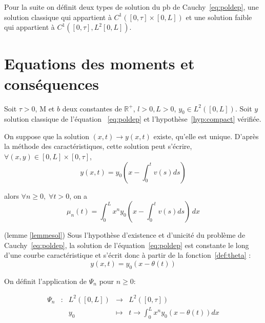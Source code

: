 \documentclass[a4paper]{article}
\newcommand{\mass}{\mathrm{M}}
\newcommand{\dep}{b}
\begin{document}
Pour la suite on définit deux types de solution du pb de Cauchy~\eqref{eq:poldep}, une solution classique qui appartient à $C^1([0,\tau]\times[0,L])$ 
et une solution faible qui appartient à $C^1([0,\tau],L^2[0,L])$.


\section{Equations des moments et conséquences}


\begin{lemme}
	\label{lemmesol}
	Soit $\tau>0$, $\mass$ et $\dep$ deux constantes de $\mathbb{R}^+$, 
	$l>0, L>0$, $y_0 \in L^2([0,L])$.
	Soit $y$ solution classique de l'équation ~\eqref{eq:poldep} et l'hypothèse~\eqref{hyp:compact} vérifiée.
	
	On suppose que la solution $(x,t) \to y(x,t)$ existe, qu'elle est unique. 
	D'après la méthode des caractéristiques, cette solution peut s'écrire,
	 $\forall (x,y) \in [0,L] \times [0, \tau]$, 
	\[y(x,t) = y_0(x-\int_{0}^t v(s)ds) \]
	
	alors $\forall n \geq 0, \; \forall t>0$, on a 
	\[\mu_n(t) = \int_0^L x^n y_0(x-\int_{0}^t v(s)ds) \, dx \]
\end{lemme}

\begin{preuve}
	(lemme \ref{lemmesol})
	Sous l'hypothèse d'existence et d'unicité du problème de Cauchy~\eqref{eq:poldep}, la solution de l'équation~\eqref{eq:poldep} est constante le long d'une courbe caractéristique et s'écrit donc à partir de la fonction~\eqref{def:theta} :
\[ y(x,t) = y_0(x-\theta(t)) \]
\end{preuve}
  
  
 On définit l'application de $\Psi_n$ pour $n \geq 0$:

   \begin{equation}
  	\begin{array}{ccccc}
  	\Psi_n & : & L^2([0,L]) & \to & L^2([0,\tau]) \\
  	 & & y_0 & \mapsto & t \to \int_0^L x^n y_0(x-\theta(t)) dx\\
  	\end{array}
  \end{equation}
  
\end{document}
